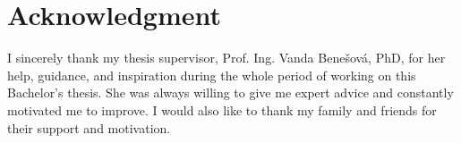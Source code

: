 \thispagestyle{empty}
\null               %
\vspace*{\fill}     %

\section*{Acknowledgment}
\vspace{1cm}

I sincerely thank my thesis supervisor, Prof. Ing. Vanda Benešová, PhD, for her help, guidance, and inspiration during the whole period of working on this Bachelor's thesis. She was always willing to give me expert advice and constantly motivated me to improve. I would also like to thank my family and friends for their support and motivation.

\vspace{2cm}

\newpage

